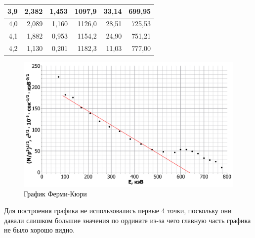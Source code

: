 \begin{enumerate}
\begin{table}[h!]
{\begin{tabular}{|r|r|r|r|r|r|}
					3,9                          & 2,382                              & 1,453                                          & 1097,9                                      & 33,14                                                                                            & 699,95                        \\ \hline
					4,0                          & 2,089                              & 1,160                                          & 1126,0                                      & 28,51                                                                                            & 725,53                        \\ \hline
					4,1                          & 1,882                              & 0,953                                          & 1154,2                                      & 24,90                                                                                            & 751,21                        \\ \hline
					4,2                          & 1,130                              & 0,201                                          & 1182,3                                      & 11,03                                                                                            & 777,00                        \\ \hline
				\end{tabular}%
			}
		\end{table}
	
		\begin{figure}[h!]
			\centering
			\includegraphics[width=\linewidth]{Pictures/jopa(E).pdf}
			\caption{График Ферми-Кюри}
		\end{figure}
	
		Для построения графика не использовались первые 4 точки, поскольку они давали слишком большие значения по ординате из-за чего главную часть графика не было хорошо видно.
		

\end{enumerate}
